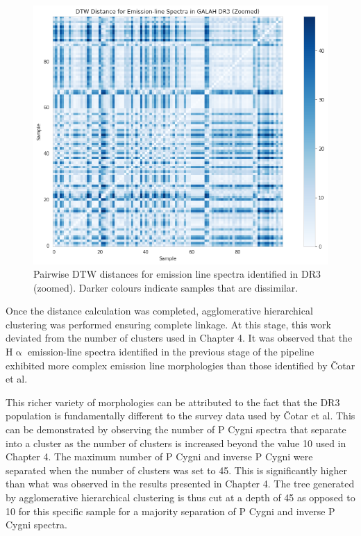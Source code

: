 \begin{figure}[!htb]
\centering
\includegraphics[scale=0.50]{figures/dtw distances dr3 zoomed.png}
\caption{Pairwise DTW distances for emission line spectra identified in DR3 (zoomed). Darker colours indicate samples that are dissimilar.}
\end{figure}

Once the distance calculation was completed, agglomerative hierarchical clustering was performed ensuring complete linkage. At this stage, this work deviated from the number of clusters used in Chapter 4. It was observed that the H$\upalpha$ emission-line spectra identified in the previous stage of the pipeline exhibited more complex emission line morphologies than those identified by Čotar et al. 

This richer variety of morphologies can be attributed to the fact that the DR3 population is fundamentally different to the survey data used by Čotar et al. This can be demonstrated by observing the number of P Cygni spectra that separate into a cluster as the number of clusters is increased beyond the value 10 used in Chapter 4. The maximum number of P Cygni and inverse P Cygni were separated when the number of clusters was set to 45. This is significantly higher than what was observed in the results presented in Chapter 4. The tree generated by agglomerative hierarchical clustering is thus cut at a depth of 45 as opposed to 10 for this specific sample for a majority separation of P Cygni and inverse P Cygni spectra. 

